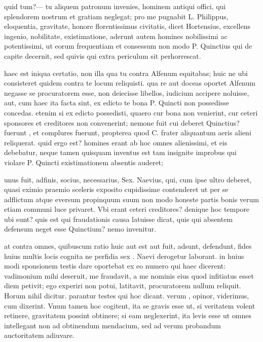  quid tum?— tu aliquem patronum invenies, hominem antiqui offici, qui splendorem nostrum et gratiam neglegat; pro me pugnabit L. Philippus, eloquentia, gravitate, honore florentissimus civitatis, dicet Hortensius, excellens ingenio, nobilitate, existimatione, aderunt autem homines nobilissimi ac potentissimi, ut eorum frequentiam et consessum non modo P. Quinctius qui de capite decernit, sed quivis qui extra periculum sit perhorrescat.

 haec est iniqua certatio, non illa qua tu contra Alfenum equitabas; huic ne ubi consisteret quidem contra te locum reliquisti. qua re aut doceas oportet Alfenum negasse se procuratorem esse, non deiecisse libellos, iudicium accipere noluisse, aut, cum haec ita facta sint, ex edicto te bona P. Quincti non possedisse concedas. etenim si ex edicto possedisti, quaero cur bona non venierint, cur ceteri sponsores et creditores non convenerint; nemone fuit cui deberet Quinctius? fuerunt , et complures fuerunt, propterea quod C. frater aliquantum aeris alieni reliquerat. quid ergo est? homines erant ab hoc omnes alienissimi, et eis debebatur, neque tamen quisquam inventus est tam insignite improbus qui violare P. Quincti existimationem absentis auderet;

 unus fuit, adfinis, socius, necessarius, Sex. Naevius, qui, cum ipse ultro deberet, quasi eximio praemio sceleris exposito cupidissime contenderet ut per se adflictum atque eversum propinquum suum non modo honeste partis bonis verum etiam communi luce privaret. Vbi erant ceteri creditores? denique hoc tempore ubi sunt? quis est qui fraudationis causa latuisse dicat, quis qui absentem defensum neget esse Quinctium? nemo invenitur.

 at contra omnes, quibuscum ratio huic aut est aut fuit, adsunt, defendunt, fides huius multis locis cognita ne perfidia sex . Naevi derogetur laborant. in huius modi sponsionem testis dare oportebat ex eo numero qui haec dicerent: vadimonium mihi deseruit, me fraudavit, a me nominis eius quod infitiatus esset diem petivit; ego experiri non potui, latitavit, procuratorem nullum reliquit. Horum nihil dicitur. parantur testes qui hoc dicant. verum , opinor, viderimus, cum dixerint. Vnum tamen hoc cogitent, ita se gravis esse ut, si veritatem volent retinere, gravitatem possint obtinere; si eam neglexerint, ita levis esse ut omnes intellegant non ad obtinendum mendacium, sed ad verum probandum auctoritatem adiuvare.

